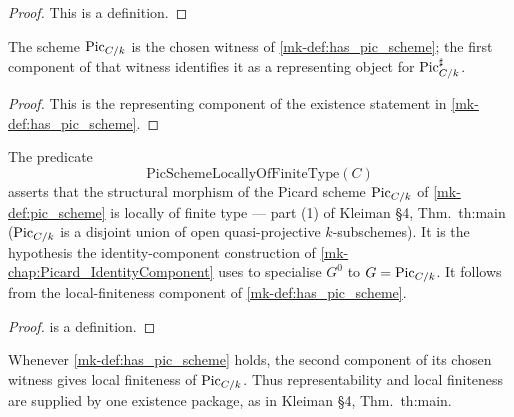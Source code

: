 \begin{proof}
  This is a definition.
\end{proof}

\begin{definition}\label{mk-def:inst_pic_sharp_representable}
  \leanok

  The scheme \(\operatorname{Pic}_{C/k}\) is the chosen witness of
  \ref{mk-def:has_pic_scheme}; the first component of that witness identifies
  it as a representing object for \(\operatorname{Pic}^\sharp_{C/k}\).

\end{definition}

\begin{proof}
  \leanok{}
  This is the representing component of the existence statement in
  \ref{mk-def:has_pic_scheme}.
\end{proof}

\begin{definition}\label{mk-def:pic_scheme_lft}
  \leanok

  The predicate
  \[
    \mathrm{PicSchemeLocallyOfFiniteType}(C)
  \]
  asserts that the
  structural morphism of the Picard scheme \(\operatorname{Pic}_{C/k}\) of
  \ref{mk-def:pic_scheme} is locally of finite type --- part (1) of Kleiman
  \S 4, Thm.~th:main (\(\operatorname{Pic}_{C/k}\) is a disjoint union of open
  quasi-projective \(k\)-subschemes). It is the hypothesis the
  identity-component construction of
  \ref{mk-chap:Picard_IdentityComponent} uses to specialise
  \(G^0\) to \(G = \operatorname{Pic}_{C/k}\). It follows from the local-finiteness
  component of \ref{mk-def:has_pic_scheme}.
\end{definition}

\begin{proof}
  \leanokThis is a definition.
\end{proof}

\begin{definition}\label{mk-def:inst_pic_scheme_lft}
  \leanok

  Whenever \ref{mk-def:has_pic_scheme} holds, the second component of its
  chosen witness gives local finiteness of \(\operatorname{Pic}_{C/k}\). Thus
  representability and local finiteness are supplied by one existence
  package, as in Kleiman \S 4, Thm.~th:main.
\end{definition}

